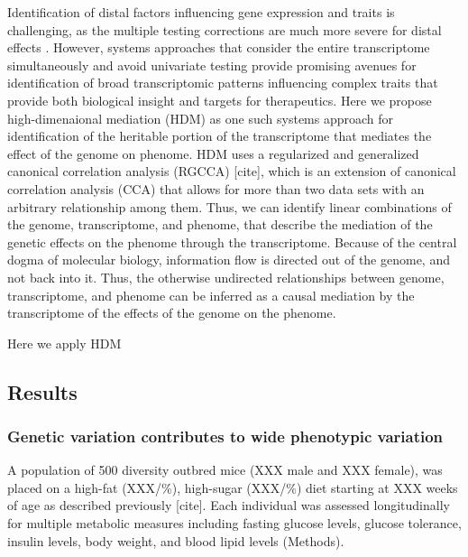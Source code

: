 \documentclass[
]{article}
\begin{document}
Identification of distal factors influencing gene expression and traits
is challenging, as the multiple testing corrections are much more severe
for distal effects \cite{pmid24013639}. However, systems approaches that
consider the entire transcriptome simultaneously and avoid univariate
testing provide promising avenues for identification of broad
transcriptomic patterns influencing complex traits that provide both
biological insight and targets for therapeutics. Here we propose
high-dimenaional mediation (HDM) as one such systems approach for
identification of the heritable portion of the transcriptome that
mediates the effect of the genome on phenome. HDM uses a regularized and
generalized canonical correlation analysis (RGCCA) {[}cite{]}, which is
an extension of canonical correlation analysis (CCA) that allows for
more than two data sets with an arbitrary relationship among them. Thus,
we can identify linear combinations of the genome, transcriptome, and
phenome, that describe the mediation of the genetic effects on the
phenome through the transcriptome. Because of the central dogma of
molecular biology, information flow is directed out of the genome, and
not back into it. Thus, the otherwise undirected relationships between
genome, transcriptome, and phenome can be inferred as a causal mediation
by the transcriptome of the effects of the genome on the phenome.

Here we apply HDM

\subsection{Results}\label{results}

\subsubsection{Genetic variation contributes to wide phenotypic
variation}\label{genetic-variation-contributes-to-wide-phenotypic-variation}

A population of 500 diversity outbred mice (XXX male and XXX female),
was placed on a high-fat (XXX/\%), high-sugar (XXX/\%) diet starting at
XXX weeks of age as described previously {[}cite{]}. Each individual was
assessed longitudinally for multiple metabolic measures including
fasting glucose levels, glucose tolerance, insulin levels, body weight,
and blood lipid levels (Methods).
\end{document}
